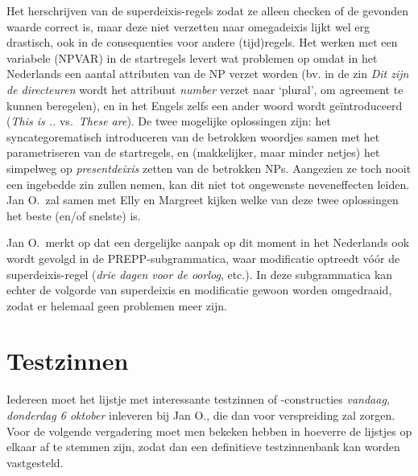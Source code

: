Het herschrijven van de superdeixis-regels zodat ze alleen checken of de 
gevonden waarde correct is, maar deze niet verzetten naar omegadeixis lijkt wel 
erg drastisch, ook in de consequenties voor andere (tijd)regels. Het werken met 
een variabele (NPVAR) in de startregels levert wat problemen op omdat in het 
Nederlands een aantal attributen van de NP verzet worden (bv. in de zin {\em 
Dit zijn de directeuren\/} wordt het attribuut {\em number\/} verzet naar 
`plural', om agreement te kunnen beregelen), en in het Engels zelfs een ander 
woord wordt ge\"{i}ntroduceerd ({\em This is ..\/} vs.\ {\em These are\/}).
De twee mogelijke oplossingen zijn: het syncategorematisch introduceren van de
betrokken woordjes samen met het parametriseren van de startregels, en 
(makkelijker, maar minder netjes) het simpelweg op {\em presentdeixis\/} zetten 
van de betrokken NPs. Aangezien ze toch nooit een ingebedde zin zullen nemen, 
kan dit niet tot ongewenste neveneffecten leiden. Jan O.\ zal samen met Elly en 
Margreet kijken welke van deze twee oplossingen het beste (en/of snelste) is.

Jan O.\ merkt op dat een dergelijke aanpak op dit moment in het Nederlands 
ook wordt gevolgd in de PREPP-subgrammatica, waar modificatie optreedt 
v\'{o}\'{o}r de superdeixis-regel ({\em drie dagen voor de oorlog\/}, etc.). In 
deze subgrammatica kan echter de volgorde van superdeixis en modificatie gewoon 
worden omgedraaid, zodat er helemaal geen problemen meer zijn.

\section{Testzinnen}
Iedereen moet het lijstje met interessante testzinnen of -constructies {\em 
vandaag, donderdag 6 oktober\/} inleveren bij Jan O., die dan voor verspreiding 
zal zorgen. Voor de volgende vergadering moet men bekeken hebben in hoeverre de 
lijstjes op elkaar af te stemmen zijn, zodat dan een definitieve testzinnenbank
kan worden vastgesteld.

